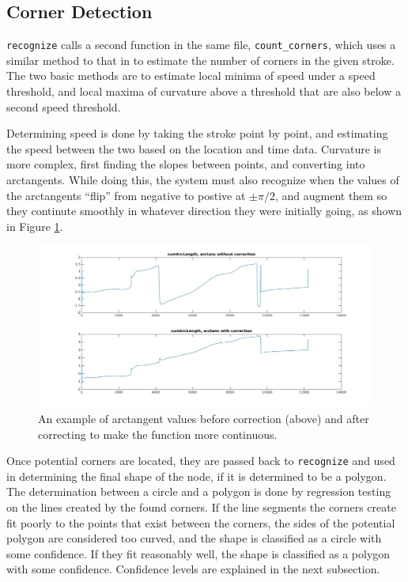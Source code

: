 \documentclass[12pt]{article}
\begin{document}
\subsection{Corner Detection}
\par \texttt{recognize} calls a second function in the same file, \texttt{count\_corners}, which uses a similar method to that in \cite{project1} to estimate the number of corners in the given stroke. The two basic methods are to estimate local minima of speed under a speed threshold, and local maxima of curvature above a threshold that are also below a second speed threshold.\\

\par Determining speed is done by taking the stroke point by point, and estimating the speed between the two based on the location and time data. Curvature is more complex, first finding the slopes between points, and converting into arctangents. While doing this, the system must also recognize when the values of the arctangents ``flip'' from negative to postive at $\pm \pi/2$, and augment them so they continute smoothly in whatever direction they were initially going, as shown in Figure \ref{arctans}.\\

\begin{figure}
\includegraphics[width=\textwidth]{question4corrected.jpg}
\caption{An example of arctangent values before correction (above) and after correcting to make the function more continuous.}
\label{arctans}
\end{figure}

\par Once potential corners are located, they are passed back to \texttt{recognize} and used in determining the final shape of the node, if it is determined to be a polygon. The determination between a circle and a polygon is done by regression testing on the lines created by the found corners. If the line segments the corners create fit poorly to the points that exist between the corners, the sides of the potential polygon are considered too curved, and the shape is classified as a circle with some confidence. If they fit reasonably well, the shape is classified as a polygon with some confidence. Confidence levels are explained in the next subsection.\\
\end{document}
